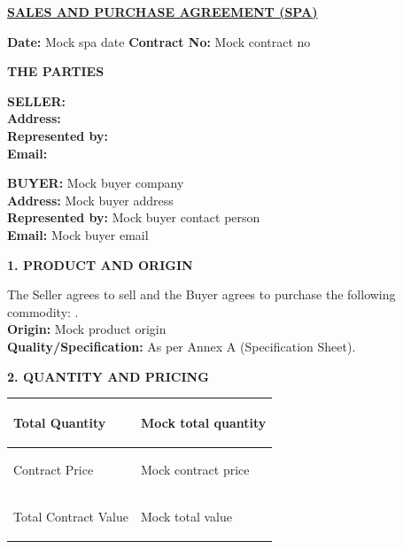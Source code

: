 \documentclass[a4paper,11pt]{article}
\begin{document}
\begin{center}
  {\Large\textbf{\underline{SALES AND PURCHASE AGREEMENT (SPA)}}}
\end{center}

\vspace{0.5cm}

\noindent \textbf{Date:} Mock spa date \hfill \textbf{Contract No:} Mock contract no

\vspace{0.8cm}
\begin{center}{\large\textbf{\color{marooncolor}THE PARTIES}}\end{center}
\vspace{0.3cm}

\noindent \textbf{SELLER:} \\
\textbf{Address:} \\
\textbf{Represented by:} \\
\textbf{Email:} 

\vspace{0.5cm}
\noindent \textbf{BUYER:} Mock buyer company\\
\textbf{Address:} Mock buyer address\\
\textbf{Represented by:} Mock buyer contact person\\
\textbf{Email:} Mock buyer email

\vspace{0.8cm}
\begin{center}{\large\textbf{\color{marooncolor}1. PRODUCT AND ORIGIN}}\end{center}
\vspace{0.2cm}
\noindent The Seller agrees to sell and the Buyer agrees to purchase the following commodity: \textbf{}.\\
\textbf{Origin:} Mock product origin\\
\textbf{Quality/Specification:} As per Annex A (Specification Sheet).

\vspace{0.5cm}
\begin{center}{\large\textbf{\color{marooncolor}2. QUANTITY AND PRICING}}\end{center}
\vspace{0.2cm}
\begin{center}
\begin{tabularx}{\textwidth}{|>{\bfseries\raggedright\arraybackslash}p{5cm}|>{\raggedright\arraybackslash}X|}
\hline
Total Quantity & Mock total quantity \\ \hline
Contract Price & Mock contract price \\ \hline
Total Contract Value & Mock total value \\ \hline
\end{tabularx}
\end{center}
\end{document}
